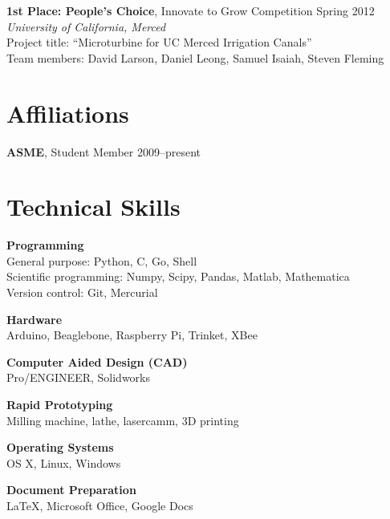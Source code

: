 \documentclass[]{res}
\begin{document}
\begin{resume}
\textbf{1st Place: People's Choice}, Innovate to Grow Competition \hfill Spring 2012 \\
\textit{University of California, Merced} \\
Project title: ``Microturbine for UC Merced Irrigation Canals'' \\
Team members: David Larson, Daniel Leong, Samuel Isaiah, Steven Fleming


\section{Affiliations}
\vspace{0.1in}

\textbf{ASME}, Student Member \hfill 2009--present


\section{Technical Skills}
\vspace{0.1in}

\textbf{Programming} \\
General purpose: Python, C, Go, Shell \\
Scientific programming: Numpy, Scipy, Pandas, Matlab, Mathematica \\
Version control: Git, Mercurial

\textbf{Hardware} \\
Arduino, Beaglebone, Raspberry Pi, Trinket, XBee

\textbf{Computer Aided Design (CAD)} \\
Pro/ENGINEER, Solidworks

\textbf{Rapid Prototyping} \\
Milling machine, lathe, lasercamm, 3D printing

\textbf{Operating Systems} \\
OS X, Linux, Windows

\textbf{Document Preparation} \\
LaTeX, Microsoft Office, Google Docs


\end{resume}
\end{document}

